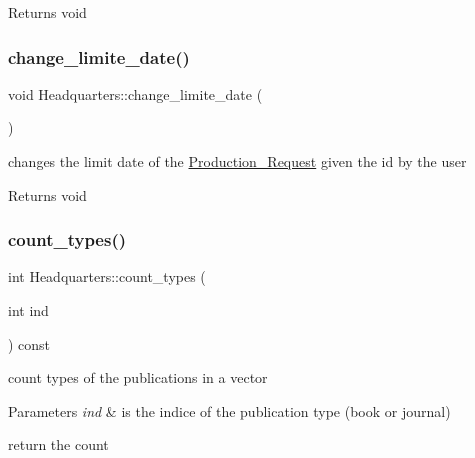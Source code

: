 \begin{DoxyReturn}{Returns}
void 
\end{DoxyReturn}
\mbox{\label{class_headquarters_a2fb8bbaf08e42b7ddb62b759298e780c}} 
\subsubsection{\texorpdfstring{change\+\_\+limite\+\_\+date()}{change\_limite\_date()}}
{\footnotesize\ttfamily void Headquarters\+::change\+\_\+limite\+\_\+date (\begin{DoxyParamCaption}{ }\end{DoxyParamCaption})}



changes the limit date of the \hyperlink{class_production___request}{Production\+\_\+\+Request} given the id by the user 

\begin{DoxyReturn}{Returns}
void 
\end{DoxyReturn}
\mbox{\label{class_headquarters_a6951a0254016c43b0d54bd17195d711d}} 
\subsubsection{\texorpdfstring{count\+\_\+types()}{count\_types()}}
{\footnotesize\ttfamily int Headquarters\+::count\+\_\+types (\begin{DoxyParamCaption}\item[{int}]{ind }\end{DoxyParamCaption}) const}



count types of the publications in a vector 


\begin{DoxyParams}{Parameters}
{\em ind} & is the indice of the publication type (book or journal)\\
\hline
\end{DoxyParams}
return the count \mbox{\label{class_headquarters_acf608a712eb8c756149f21ab1d6b38f5}} 
